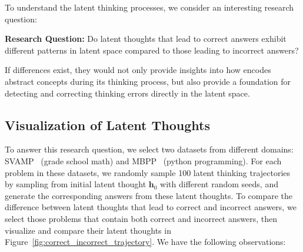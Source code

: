 \documentclass{article} %
\begin{document}
To understand the latent thinking processes, we consider an interesting research question:
\begin{tcolorbox}[enhanced,
    colframe=blue!40!black,
    colback=blue!2!white,
    fonttitle=\bfseries,
  attach boxed title to top text left={xshift=30mm,yshift=-2.5mm},
  boxed title style={size=small,colframe=blue!40!black,colback=blue!40!black}]
\textbf{Research Question:} Do latent thoughts that lead to correct answers exhibit different patterns in latent space compared to those leading to incorrect answers?
\end{tcolorbox}
If differences exist, they would not only provide insights into how \LRLM encodes abstract concepts during its thinking process, but also provide a foundation for detecting and correcting thinking errors directly in the latent space.
%
\subsection{Visualization of Latent Thoughts}\label{sec:visualization_latent_thoughts}
To answer this research question, we select two datasets from different domains: SVAMP~\citep{patel2021nlp} (grade school math) and MBPP~\citep{austin2021program} (python programming). For each problem in these datasets, we randomly sample 100 latent thinking trajectories by sampling from initial latent thought $\mathbf{h}_0$ with different random seeds, and generate the corresponding answers from these latent thoughts. To compare the difference between latent thoughts that lead to correct and incorrect answers, we select those problems that contain both correct and incorrect answers, then visualize and compare their latent thoughts in Figure~\ref{fig:correct_incorrect_trajectory}. We have the following observations:
\vspace{-0.1cm}
\end{document}
